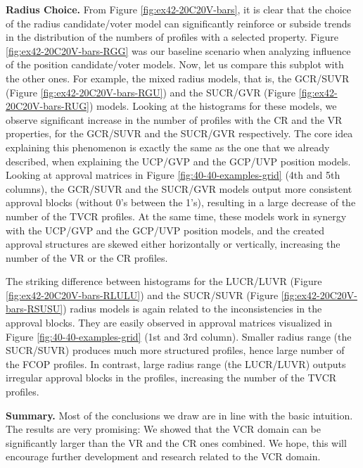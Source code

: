 \noindent \textbf{Radius Choice.} \indent From Figure \ref{fig:ex42-20C20V-bars},
it is clear that the choice of the radius candidate/voter model can significantly reinforce or subside
trends in the distribution of the numbers of profiles with a selected property.
Figure \ref{fig:ex42-20C20V-bars-RGG} was our baseline scenario when analyzing influence of the position candidate/voter models.
Now, let us compare this subplot with the other ones.
For example, the mixed radius models, that is, the GCR/SUVR (Figure \ref{fig:ex42-20C20V-bars-RGU})
and the SUCR/GVR (Figure \ref{fig:ex42-20C20V-bars-RUG}) models.
Looking at the histograms for these models,
we observe significant increase in the number of profiles with the CR and the VR properties,
for the GCR/SUVR and the SUCR/GVR respectively.
The core idea explaining this phenomenon is exactly the same as the one that we already described,
when explaining the UCP/GVP and the GCP/UVP position models.
Looking at approval matrices in Figure \ref{fig:40-40-examples-grid} (4th and 5th columns),
the GCR/SUVR and the SUCR/GVR models output more consistent approval blocks (without 0's between the 1's),
resulting in a large decrease of the number of the TVCR profiles.
At the same time, these models work in synergy with the UCP/GVP and the GCP/UVP position models,
and the created approval structures are skewed either horizontally or vertically,
increasing the number of the VR or the CR profiles.

The striking difference between histograms for
the LUCR/LUVR (Figure \ref{fig:ex42-20C20V-bars-RLULU}) and the SUCR/SUVR (Figure \ref{fig:ex42-20C20V-bars-RSUSU}) radius models
is again related to the inconsistencies in the approval blocks.
They are easily observed in approval matrices visualized in Figure \ref{fig:40-40-examples-grid} (1st and 3rd column). 
Smaller radius range (the SUCR/SUVR) produces much more structured profiles, hence large number of the FCOP profiles.
In contrast, large radius range (the LUCR/LUVR) outputs irregular approval blocks in the profiles,
increasing the number of the TVCR profiles.
\newline

\noindent \textbf{Summary.} \indent
Most of the conclusions we draw are in line with the basic intuition.
The results are very promising:
We showed that the VCR domain can be significantly larger than the VR and the CR ones combined.
We hope, this will encourage further development and research related to the VCR domain.



